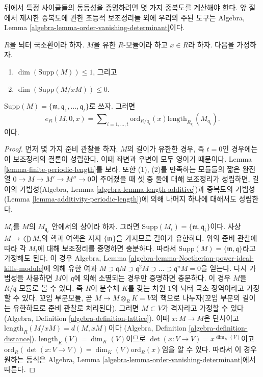 \noindent
뒤에서 특정 사이클들의 동등성을 증명하려면 몇 가지 중복도를 계산해야
한다. 앞 절에서 제시한 중복도에 관한 초등적 보조정리들 외에 우리의
주된 도구는 Algebra, Lemma
\ref{algebra-lemma-order-vanishing-determinant}이다.

\begin{lemma}
\label{lemma-length-multiplication}
$R$을 뇌터 국소환이라 하자. $M$을 유한 $R$-모듈이라 하고
$x \in R$라 하자. 다음을 가정하자.
\begin{enumerate}
\item $\dim(\text{Supp}(M)) \leq 1$, 그리고
\item $\dim(\text{Supp}(M/xM)) \leq 0$.
\end{enumerate}
$\text{Supp}(M) = \{\mathfrak m, \mathfrak q_1, \ldots, \mathfrak q_t\}$로 쓰자.
그러면
$$
e_R(M, 0, x) =
\sum\nolimits_{i = 1, \ldots, t}
\text{ord}_{R/\mathfrak q_i}(x)
\text{length}_{R_{\mathfrak q_i}}(M_{\mathfrak q_i}).
$$
이다.
\end{lemma}

\begin{proof}
먼저 몇 가지 준비 관찰을 하자. $M$의 길이가 유한한 경우, 즉
$t = 0$인 경우에는 이 보조정리의 결론이 성립한다. 이때 좌변과 우변이
모두 영이기 때문이다. Lemma \ref{lemma-finite-periodic-length}를 보라.
또한 (1), (2)를 만족하는 모듈들의 짧은 완전열
$0 \to M \to M' \to M'' \to 0$이 주어졌을 때 셋 중 둘에 대해
보조정리가 성립하면, 길이의 가법성(Algebra, Lemma
\ref{algebra-lemma-length-additive})과 중복도의 가법성(Lemma
\ref{lemma-additivity-periodic-length})에 의해 나머지 하나에 대해서도
성립한다.

\medskip\noindent
$M_i$를 $M$의 $M_{\mathfrak q_i}$ 안에서의 상이라 하자. 그러면
$\text{Supp}(M_i) = \{\mathfrak m, \mathfrak q_i\}$이다. 사상
$M \to \bigoplus M_i$의 핵과 여핵은 지지 $\{\mathfrak m\}$을 가지므로
길이가 유한하다. 위의 준비 관찰에 따라 각 $M_i$에 대해 보조정리를
증명하면 충분하다. 따라서
$\text{Supp}(M) = \{\mathfrak m, \mathfrak q\}$라고 가정해도 된다.
이 경우 Algebra, Lemma
\ref{algebra-lemma-Noetherian-power-ideal-kills-module}에 의해 유한 여과
$M \supset \mathfrak qM \supset \mathfrak q^2M \supset \ldots \supset
\mathfrak q^nM = 0$을 얻는다. 다시 가법성을 사용하면 $M$이
$\mathfrak q$에 의해 소멸되는 경우만 증명하면 충분하다. 이 경우
$M$을 $R/\mathfrak q$-모듈로 볼 수 있다. 즉 $R$이 분수체 $K$를 갖는
차원 $1$의 뇌터 국소 정역이라고 가정할 수 있다. 꼬임 부분모듈, 곧
$M \to M \otimes_R K = V$의 핵으로 나누자(꼬임 부분의 길이는 유한하므로
준비 관찰로 처리된다). 그러면 $M \subset V$가 격자라고 가정할 수 있다
(Algebra, Definition \ref{algebra-definition-lattice}). 이때
$x : M \to M$은 단사이고
$\text{length}_R(M/xM) = d(M, xM)$이다
(Algebra, Definition \ref{algebra-definition-distance}).
$\text{length}_K(V) = \dim_K(V)$이므로
$\det(x : V \to V) = x^{\dim_K(V)}$이고
$\text{ord}_R(\det(x : V \to V)) = \dim_K(V) \text{ord}_R(x)$임을 알 수 있다.
따라서 이 경우 원하는 등식은 Algebra, Lemma
\ref{algebra-lemma-order-vanishing-determinant}에서 따른다.
\end{proof}

